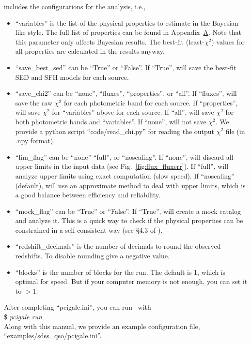  includes the configurations for the analysis, i.e.,
\begin{itemize}
    \item ``variables'' is the list of the physical properties to estimate in the Bayesian-like style. 
    The full list of properties can be found in Appendix~\hyperref[app:par]{A}.
    Note that this parameter only affects Bayesian results. 
    The best-fit (least-$\chi^2$) values for all properties are calculated in the results anyway.
    \item ``save\_best\_sed'' can be ``True'' or ``False''. 
    If ``True'', will save the best-fit SED and SFH models for each source. 
    \item ``save\_chi2'' can be ``none'', ``fluxes'', ``properties'', or ``all''. 
    If ``fluxes'', will save the raw $\chi^2$ for each photometric band for each source. 
    If ``properties'', will save $\chi^2$ for ``variables'' above for each source.
    If ``all'', will save $\chi^2$ for both photometric bands and ``variables''.
    If ``none'', will not save $\chi^2$.
    We provide a {\sc python} script ``code/read\_chi.py'' for reading the output $\chi^2$ file (in .npy format).
    \item ``lim\_flag'' can be ``none'' ``full'', or ``noscaling''. 
    If ``none'', will discard all upper limits in the input data (see Fig.~\ref{fig:flux_fluxerr}).
    If ``full'', will analyze upper limits using exact computation (slow speed). 
    If ``noscaling'' (default), will use an approximate method to deal with upper limits, which is a good balance between efficiency and reliability.
    \item ``mock\_flag'' can be ``True'' or ``False''.
    If ``True'', will create a mock catalog and analyze it. 
    This is a quick way to check if the physical properties can be constrained in a self-consistent way (see \S4.3 of \citealt{boquien19}).
    \item ``redshift\_decimals'' is the number of decimals to round the observed redshifts. 
    To disable rounding give a negative value.
    \item ``blocks'' is the number of blocks for the run.
    The default is 1, which is optimal for speed. 
    But if your computer memory is not enough, you can set it to $>1$. 
\end{itemize}
After completing ``pcigale.ini'', you can run \xcig\ with \\
\$ \textit{pcigale run} \\
Along with this manual, we provide an example configuration file, ``examples/sdss\_qso/pcigale.ini''.  

